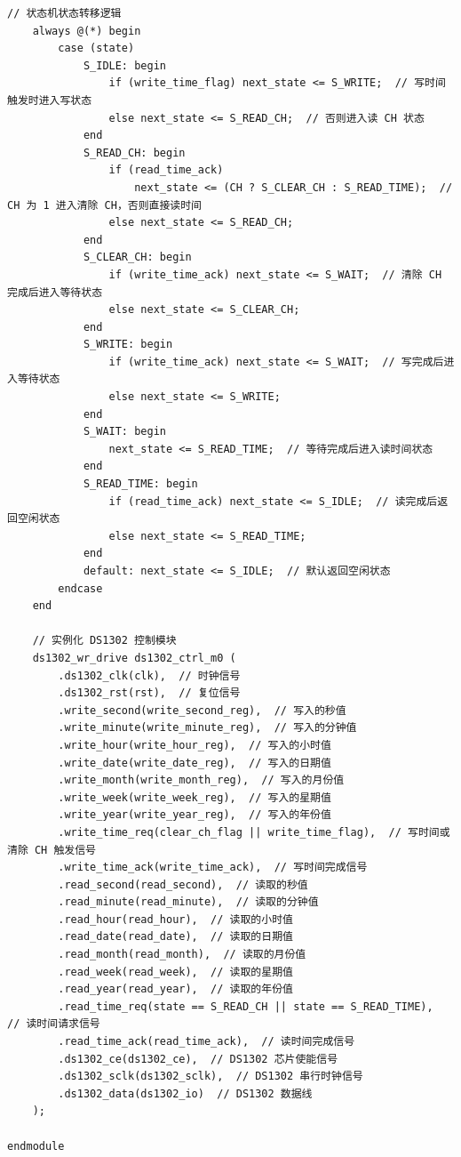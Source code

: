 \documentclass[a4paper,10pt]{article}
\begin{document}
\begin{lstlisting}[caption=ds1302_test.v]
    // 状态机状态转移逻辑
    always @(*) begin
        case (state)
            S_IDLE: begin
                if (write_time_flag) next_state <= S_WRITE;  // 写时间触发时进入写状态
                else next_state <= S_READ_CH;  // 否则进入读 CH 状态
            end
            S_READ_CH: begin
                if (read_time_ack)
                    next_state <= (CH ? S_CLEAR_CH : S_READ_TIME);  // CH 为 1 进入清除 CH，否则直接读时间
                else next_state <= S_READ_CH;
            end
            S_CLEAR_CH: begin
                if (write_time_ack) next_state <= S_WAIT;  // 清除 CH 完成后进入等待状态
                else next_state <= S_CLEAR_CH;
            end
            S_WRITE: begin
                if (write_time_ack) next_state <= S_WAIT;  // 写完成后进入等待状态
                else next_state <= S_WRITE;
            end
            S_WAIT: begin
                next_state <= S_READ_TIME;  // 等待完成后进入读时间状态
            end
            S_READ_TIME: begin
                if (read_time_ack) next_state <= S_IDLE;  // 读完成后返回空闲状态
                else next_state <= S_READ_TIME;
            end
            default: next_state <= S_IDLE;  // 默认返回空闲状态
        endcase
    end

    // 实例化 DS1302 控制模块
    ds1302_wr_drive ds1302_ctrl_m0 (
        .ds1302_clk(clk),  // 时钟信号
        .ds1302_rst(rst),  // 复位信号
        .write_second(write_second_reg),  // 写入的秒值
        .write_minute(write_minute_reg),  // 写入的分钟值
        .write_hour(write_hour_reg),  // 写入的小时值
        .write_date(write_date_reg),  // 写入的日期值
        .write_month(write_month_reg),  // 写入的月份值
        .write_week(write_week_reg),  // 写入的星期值
        .write_year(write_year_reg),  // 写入的年份值
        .write_time_req(clear_ch_flag || write_time_flag),  // 写时间或清除 CH 触发信号
        .write_time_ack(write_time_ack),  // 写时间完成信号
        .read_second(read_second),  // 读取的秒值
        .read_minute(read_minute),  // 读取的分钟值
        .read_hour(read_hour),  // 读取的小时值
        .read_date(read_date),  // 读取的日期值
        .read_month(read_month),  // 读取的月份值
        .read_week(read_week),  // 读取的星期值
        .read_year(read_year),  // 读取的年份值
        .read_time_req(state == S_READ_CH || state == S_READ_TIME),  // 读时间请求信号
        .read_time_ack(read_time_ack),  // 读时间完成信号
        .ds1302_ce(ds1302_ce),  // DS1302 芯片使能信号
        .ds1302_sclk(ds1302_sclk),  // DS1302 串行时钟信号
        .ds1302_data(ds1302_io)  // DS1302 数据线
    );

endmodule

\end{lstlisting}
\end{document}
